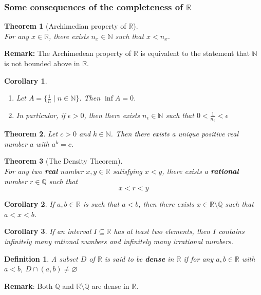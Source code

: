 \documentclass[12pt]{article}
\newtheorem{definition}{Definition}[section]
\newtheorem{theorem}{Theorem}[section]
\newtheorem{corollary}{Corollary}[section]
\theoremstyle{definition}
\begin{document}
\subsubsection{Some consequences of the completeness of $\mathbb{R}$}
\begin{theorem}[Archimedian property of $\mathbb{R}$]\hfill\\\normalfont
For any $x\in\mathbb{R}$, there exists $n_x\in\mathbb{N}$ such that $x<n_x$.
\end{theorem}
\textbf{Remark:} The Archimedean property of $\mathbb{R}$ is equivalent to the statement that $\mathbb{N}$ is not bounded above in $\mathbb{R}$.
\begin{corollary}\hfill
\normalfont\begin{enumerate}
\item Let $A=\{\frac{1}{n}\mid n\in\mathbb{N}\}$. Then $\inf A=0$.
\item In particular, if $\epsilon>0$, then there exists $n_\epsilon\in\mathbb{N}$ such that $0<\frac{1}{n_\epsilon}<\epsilon$
\end{enumerate}
\end{corollary}
\begin{theorem}\normalfont Let $c>0$ and $k\in\mathbb{N}$. Then there exists a unique positive real number $a$ with $a^k=c$.
\end{theorem}
\begin{theorem}[The Density Theorem]
\hfill\\
\normalfont For any two \textbf{real} number $x,y\in\mathbb{R}$ satisfying $x<y$, there exists a \textbf{rational} number $r\in\mathbb{Q}$ such that
\[
x<r<y
\]
\end{theorem}
\begin{corollary}\normalfont If $a,b\in\mathbb{R}$ is such that $a<b$, then there exists $x\in\mathbb{R}\setminus\mathbb{Q}$ such that $a<x<b$.
\end{corollary}
\begin{corollary}\normalfont If an interval $I\subseteq \mathbb{R}$ has at least two elements, then $I$ contains infinitely many rational numbers and infinitely many irrational numbers. 
\end{corollary}
\begin{definition}\normalfont A subset $D$ of $\mathbb{R}$ is said to be \textbf{dense} in $\mathbb{R}$ if for any $a,b\in\mathbb{R}$ with $a<b$, $D\cap(a,b)\neq\varnothing$
\end{definition}
\textbf{Remark}: Both $\mathbb{Q}$ and $\mathbb{R}\setminus\mathbb{Q}$ are dense in $\mathbb{R}$.
\end{document}
